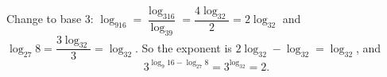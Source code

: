 Change to base $3$: $\log_916=\dfrac{\log_316}{\log_39}=\dfrac{4\log_32}{2}=2\log_32$ and $\log_{27}8=\dfrac{3\log_32}{3}=\log_32$. So the exponent is $2\log_32-\log_32=\log_32$, and
\[
3^{\log_9 16-\log_{27}8}=3^{\log_32}=\boxed{2}.
\]
